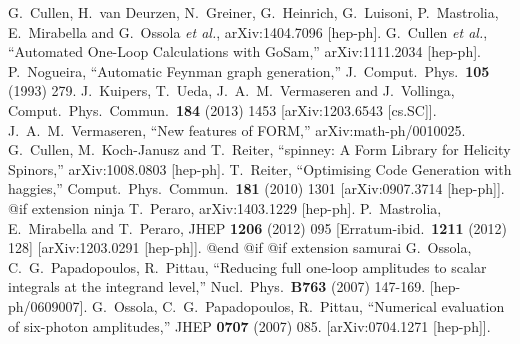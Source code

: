 {{{{{{{\begin{thebibliography}{ABC}
  G.~Cullen, H.~van Deurzen, N.~Greiner, G.~Heinrich, G.~Luisoni, P.~Mastrolia, E.~Mirabella and G.~Ossola {\it et al.},
  arXiv:1404.7096 [hep-ph].
  G.~Cullen {\it et al.},
  ``Automated One-Loop Calculations with GoSam,''
  arXiv:1111.2034 [hep-ph].
  P.~Nogueira,
  ``Automatic Feynman graph generation,''
  J.\ Comput.\ Phys.\  {\bf 105} (1993) 279.
  J.~Kuipers, T.~Ueda, J.~A.~M.~Vermaseren and J.~Vollinga,
  Comput.\ Phys.\ Commun.\  {\bf 184} (2013) 1453
  [arXiv:1203.6543 [cs.SC]].
  J.~A.~M.~Vermaseren,
  ``New features of FORM,''
  arXiv:math-ph/0010025.
  G.~Cullen, M.~Koch-Janusz and T.~Reiter,
  ``spinney: A Form Library for Helicity Spinors,''
  arXiv:1008.0803 [hep-ph].
  T.~Reiter,
  ``Optimising Code Generation with haggies,''
  Comput.\ Phys.\ Commun.\  {\bf 181} (2010) 1301
  [arXiv:0907.3714 [hep-ph]].
@if extension ninja %
  T.~Peraro,
  arXiv:1403.1229 [hep-ph].
  P.~Mastrolia, E.~Mirabella and T.~Peraro,
  JHEP {\bf 1206} (2012) 095
   [Erratum-ibid.\  {\bf 1211} (2012) 128]
  [arXiv:1203.0291 [hep-ph]].
@end @if %
@if extension samurai %
  G.~Ossola, C.~G.~Papadopoulos, R.~Pittau,
  ``Reducing full one-loop amplitudes to scalar integrals at the
    integrand level,''
  Nucl.\ Phys.\  {\bf B763 } (2007)  147-169.
  [hep-ph/0609007].
  G.~Ossola, C.~G.~Papadopoulos, R.~Pittau,
  ``Numerical evaluation of six-photon amplitudes,''
  JHEP {\bf 0707 } (2007)  085.
  [arXiv:0704.1271 [hep-ph]].

\end{thebibliography}}}}}}}}
